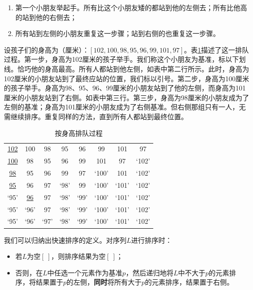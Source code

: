 \documentclass[b5paper]{ctexart}
\begin{document}
\begin{enumerate}
  \item 第一个小朋友举起手。所有比这个小朋友矮的都站到他的左侧去；所有比他高的站到他的右侧去；
  \item 所有站到左侧的小朋友重复这一步骤；站到右侧的也重复这一步骤。
\end{enumerate}

设孩子们的身高为（厘米）：$[102, 100, 98, 95, 96, 99, 101, 97]$。表\ref{tab:kids-sort}描述了这一排队过程。第一步，身高为102厘米的孩子举手。我们称这个小朋友为基准，标以下划线。恰巧他的身高最高。所有人都站到他左侧，如表中第二行所示。此时，身高为102厘米的小朋友站到了最终应站的位置，我们标以引号。第二步，身高为100厘米的孩子举手。身高为98、95、96、99厘米的小朋友站到了他的左侧，而身高为101厘米的小朋友站到了右侧。如表中第三行。第三步，身高为98厘米的小朋友成为了左侧的基准；身高为101厘米的小朋友成为了右侧基准。但右侧那组只有一人，无需继续排序。重复同样的方法，直到所有人都站到最终位置。

\begin{table}[htbp]
\centering
\begin{tabular}{ | c c c c c c c c |}
\hline
\underline{102} & 100 & 98 & 95 & 96 & 99 & 101 & 97 \\
\underline{100} & 98 & 95 & 96 & 99 & 101 & 97 & `102' \\
\underline{98} & 95 & 96 & 99 & 97 & `100' & 101 & `102' \\
\underline{95} & 96 & 97 & `98' & 99 & `100' & `101' & `102' \\
`95' & \underline{96} & 97 & `98' & `99' & `100' & `101' & `102' \\
`95' & `96' & 97 & `98' & `99' & `100' & `101' & `102' \\
`95' & `96' & `97' & `98' & `99' & `100' & `101' & `102' \\
\hline
\end{tabular}
\caption{按身高排队过程}
\label{tab:kids-sort}
\end{table}

我们可以归纳出快速排序的定义。对序列$L$进行排序时：

\begin{itemize}
\item 若$L$为空$[\ ]$，则排序结果为空$[\ ]$；
\item 否则，在$L$中任选一个元素作为基准$p$，然后递归地将$L$中不大于$p$的元素排序，将结果置于$p$的左侧，\textbf{同时}将所有大于$p$的元素排序，结果置于右侧。
\end{itemize}
\end{document}

